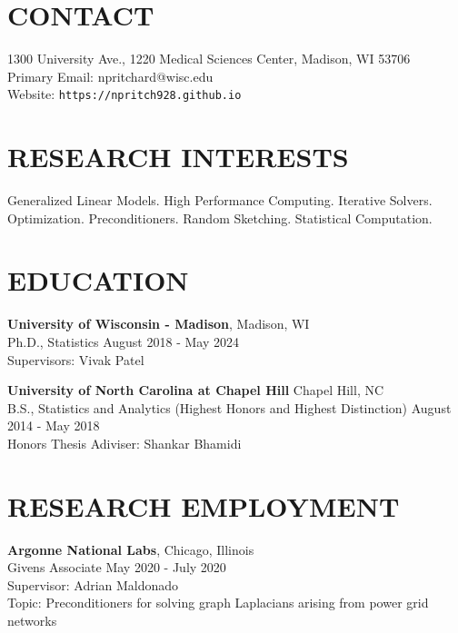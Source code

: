 \documentclass[margin,11pt]{res}
\begin{document}
  
                        
\begin{resume}                        
  
  \section{CONTACT} 
  1300 University Ave., 1220 Medical Sciences Center, Madison, WI 53706 \\
  Primary Email: npritchard@wisc.edu \\
  Website: \texttt{https://npritch928.github.io}

  \section{RESEARCH INTERESTS}
  Generalized Linear Models. High Performance Computing. Iterative Solvers. Optimization. Preconditioners. Random Sketching. Statistical Computation.
              
\section{EDUCATION}      
                {\bf University of Wisconsin - Madison}, \hfill Madison, WI \\
                Ph.D., Statistics \hfill August 2018 - May 2024\\
		        Supervisors: Vivak Patel 
                
                {\bf University of North Carolina at Chapel Hill} \hfill Chapel Hill, NC \\
                B.S., Statistics and Analytics (Highest Honors and Highest Distinction) \hfill August 2014 - May 2018\\
                Honors Thesis Adiviser: Shankar Bhamidi
  
\section{RESEARCH EMPLOYMENT}
                {\bf Argonne National Labs}, \hfill Chicago, Illinois\\
                Givens Associate \hfill May 2020 - July 2020\\
                Supervisor: Adrian Maldonado\\
                Topic: Preconditioners for solving graph Laplacians arising from power grid networks
                

\end{resume}
\end{document}

